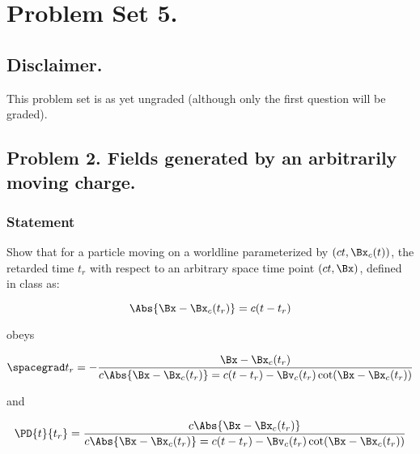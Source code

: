 
\usepackage{cancel}
%

\chapter{Problem Set 5.}
\label{chap:relElectroDynProblemSet5}
\date{Mar 14, 2011}

\beginArtWithToc

\section{Disclaimer.}

This problem set is as yet ungraded (although only the first question will be graded).



\section{Problem 2.  Fields generated by an arbitrarily moving charge.}

\subsection{Statement}

Show that for a particle moving on a worldline parameterized by $(ct, \Bx_c(t))$, the retarded time $t_r$ with respect to an arbitrary space time point $(ct, \Bx)$, defined in class as:

\begin{equation}\label{eqn:relElectroDynProblemSet5:10}
\Abs{\Bx - \Bx_c(t_r)} = c(t - t_r)
\end{equation}

obeys 

\begin{equation}\label{eqn:relElectroDynProblemSet5:30}
\spacegrad t_r = -\frac{\Bx - \Bx_c(t_r)}{
c \Abs{\Bx - \Bx_c(t_r)} = c(t - t_r) - \Bv_c(t_r) \cot (\Bx - \Bx_c(t_r))
}
\end{equation}

and

\begin{equation}\label{eqn:relElectroDynProblemSet5:50}
\PD{t}{t_r} = \frac{c \Abs{\Bx - \Bx_c(t_r)}}{
c \Abs{\Bx - \Bx_c(t_r)} = c(t - t_r) - \Bv_c(t_r) \cot (\Bx - \Bx_c(t_r))
}
\end{equation}

